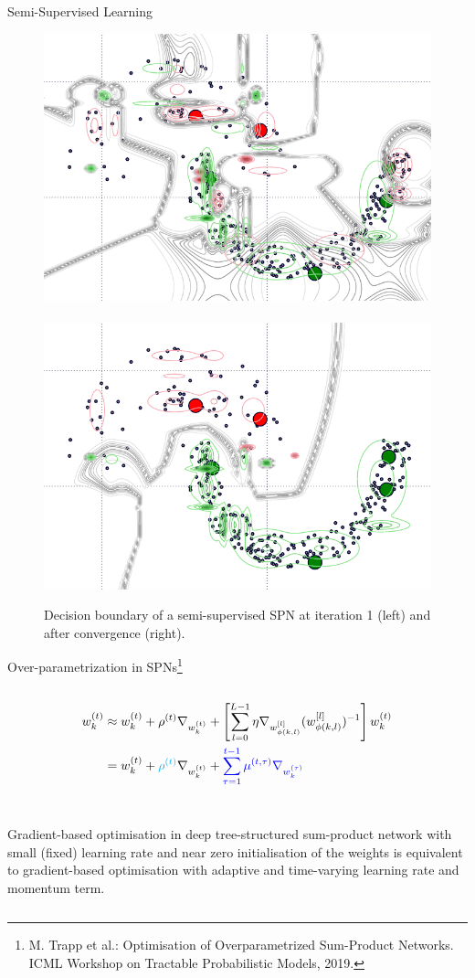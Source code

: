 \begin{frame}{Semi-Supervised Learning}{}
\begin{figure}
    \includegraphics[width=.47\textwidth]{semisupervised_2_2}~
    \includegraphics[width=.47\textwidth]{semisupervised_20_2}
    \caption{Decision boundary of a semi-supervised SPN at iteration 1 (left) and after convergence (right).}
\end{figure}

\end{frame}

\begin{frame}{Over-parametrization in SPNs\footnote{\scriptsize M. Trapp et al.: Optimisation of Overparametrized Sum-Product Networks. ICML Workshop on Tractable Probabilistic Models, 2019.}}{}
\begin{columns}
\begin{column}{\linewidth}
\begin{align}
    w^{(t)}_{k} &\approx w^{(t)}_{k} + \rho^{(t)} \nabla_{w^{(t)}_{k}} + \left[ \sum_{l=0}^{L-1} \eta \nabla_{w^{[l]}_{\phi(k, l)}} (w^{[l]}_{\phi(k, l)})^{-1} \right] w^{(t)}_{k} \\
  &= w^{(t)}_{k} + {\color{cyan} \rho^{(t)}} \nabla_{w^{(t)}_{k}} + {\color{blue}\sum_{\tau=1}^{t-1} \mu^{(t,\tau)} \nabla_{w^{(\tau)}_k}}
\end{align}\\
  \begin{tcolorbox}[lower separated=false]
  \small{Gradient-based optimisation in deep tree-structured sum-product network with small (fixed) learning rate and near zero initialisation of the weights is equivalent to gradient-based optimisation with adaptive and time-varying {\color{cyan} learning rate} and {\color{blue} momentum term}.}
 \end{tcolorbox}
\end{column}
\end{columns}
\end{frame}

